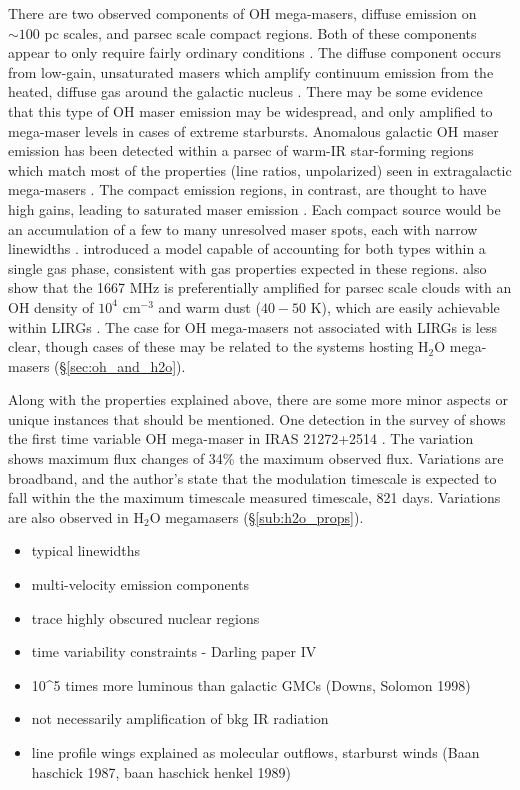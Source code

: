 There are two observed components of OH mega-masers, diffuse emission on $\sim 100$ pc scales, and parsec scale compact regions. Both of these components appear to only require fairly ordinary conditions \citep{lo2005}. The diffuse component occurs from low-gain, unsaturated masers which amplify continuum emission from the heated, diffuse gas around the galactic nucleus \citep[e.g.]{Baan_1985}. There may be some evidence that this type of OH maser emission may be widespread, and only amplified to mega-maser levels in cases of extreme starbursts. Anomalous galactic OH maser emission has been detected within a parsec of warm-IR star-forming regions which match most of the properties (line ratios, unpolarized) seen in extragalactic mega-masers \cite{Mirabel_1989}.  The compact emission regions, in contrast, are thought to have high gains, leading to saturated maser emission \citep[e.g.,]{lonsdale2002}. Each compact source would be an accumulation of a few to many unresolved maser spots, each with narrow linewidths \citet{lo2005}.  \citet{Parra_2005} introduced a model capable of accounting for both types within a single gas phase, consistent with gas properties expected in these regions. \citet{randell1995} also show that the 1667 MHz is preferentially amplified for parsec scale clouds with an OH density of $10^4$ cm$^{-3}$ and warm dust ($40-50$ K), which are easily achievable within LIRGs \citep{lo2005}. The case for OH mega-masers not associated with LIRGs is less clear, though cases of these may be related to the systems hosting H$_2$O mega-masers (\S\ref{sec:oh_and_h2o}).

Along with the properties explained above, there are some more minor aspects or unique instances that should be mentioned. One detection in the survey of \citet{darling2002_paperIII} shows the first time variable OH mega-maser in IRAS 21272+2514 \citep[$z\sim 0.15$]{darling2002_timevar}. The variation shows maximum flux changes of 34\% the maximum observed flux. Variations are broadband, and the author's state that the modulation timescale is expected to fall within the the maximum timescale measured timescale, 821 days. Variations are also observed in H$_{2}$O megamasers (\S\ref{sub:h2o_props}). 

\begin{itemize}
\item typical linewidths 
\item multi-velocity emission components
\item trace highly obscured nuclear regions
\item time variability constraints - Darling paper IV
\item 10^5 times more luminous than galactic GMCs (Downs, Solomon 1998)
\item not necessarily amplification of bkg IR radiation
\item line profile wings explained as molecular outflows, starburst winds (Baan haschick 1987, baan haschick henkel 1989)
\end{itemize}

